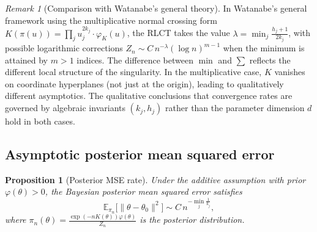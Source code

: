 \documentclass[11pt,letterpaper]{amsart}
\numberwithin{equation}{section}
\theoremstyle{plain}
\newtheorem{proposition}[theorem]{Proposition}
\theoremstyle{definition}
\theoremstyle{remark}
\newtheorem{remark}[theorem]{Remark}
\begin{document}
\begin{remark}[Comparison with Watanabe's general theory]
\label{rem:watanabe_comparison}
In Watanabe's general framework using the multiplicative normal crossing form $K(\pi(u)) = \prod_{j} u_j^{2k_j}\cdot\varphi_K(u)$, the RLCT takes the value $\lambda = \min_j \frac{h_j+1}{2k_j}$, with possible logarithmic corrections $Z_n \sim C\,n^{-\lambda}(\log n)^{m-1}$ when the minimum is attained by $m > 1$ indices. The difference between $\min$ and $\sum$ reflects the different local structure of the singularity. In the multiplicative case, $K$ vanishes on coordinate hyperplanes (not just at the origin), leading to qualitatively different asymptotics. The qualitative conclusions that convergence rates are governed by algebraic invariants $(k_j, h_j)$ rather than the parameter dimension $d$ hold in both cases.
\end{remark}


\subsection{Asymptotic posterior mean squared error}

\begin{proposition}[Posterior MSE rate]
\label{prop:posterior_MSE}
Under the additive assumption with prior $\varphi(\theta) > 0$, the Bayesian posterior mean squared error satisfies
\[
\mathbb{E}_{\pi_n} \big[ \|\theta - \theta_0\|^2 \big]
\sim
C \, n^{-\min_j \frac{1}{k_j}},
\]
where $\pi_n(\theta) = \frac{\exp(-nK(\theta))\varphi(\theta)}{Z_n}$ is the posterior distribution.
\end{proposition}
\end{document}
